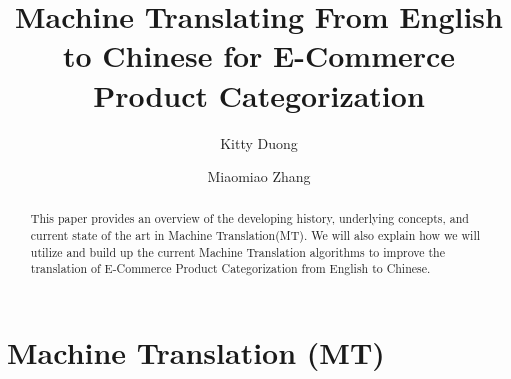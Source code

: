 \documentclass[sigconf]{acmart}
\begin{document}
\title{Machine Translating From English to Chinese for E-Commerce Product Categorization}
\author{Kitty Duong}

\author{Miaomiao Zhang}

\begin{abstract}
    This paper provides an overview of the developing history, underlying concepts, and current state of the art in Machine Translation(MT). We will also explain how we will utilize and build up the current Machine Translation algorithms to improve the translation of E-Commerce Product Categorization from English to Chinese.
\end{abstract}
\maketitle

\section{Machine Translation (MT)} %
    
\end{document}
